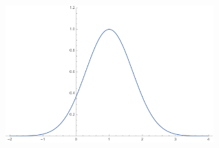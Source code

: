 \begin{frame}
	\linespread{1.5}
	
	\begin{center}
		\includegraphics[width=8cm]{./images/ch3/e-2x.pdf}
	\end{center}
\end{frame}